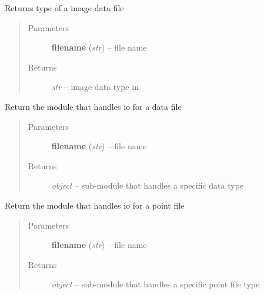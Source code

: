 \documentclass[letterpaper,10pt,english]{sphinxmanual}
\begin{document}

\begin{fulllineitems}
\label{api/ClearMap.IO:ClearMap.IO.IO.dataFileNameToType}
Returns type of a image data file
\begin{quote}\begin{description}
\item[{Parameters}] \leavevmode
\textbf{filename} (\emph{str}) --
file name

\item[{Returns}] \leavevmode
\emph{str} --
image data type in {\hyperref[api/ClearMap.IO:ClearMap.IO.IO.dataFileTypes]{\emph{}}}

\end{description}\end{quote}

\end{fulllineitems}


\begin{fulllineitems}
\label{api/ClearMap.IO:ClearMap.IO.IO.dataFileNameToModule}
Return the module that handles io for a data file
\begin{quote}\begin{description}
\item[{Parameters}] \leavevmode
\textbf{filename} (\emph{str}) --
file name

\item[{Returns}] \leavevmode
\emph{object} --
sub-module that handles a specific data type

\end{description}\end{quote}

\end{fulllineitems}


\begin{fulllineitems}
\label{api/ClearMap.IO:ClearMap.IO.IO.pointFileNameToModule}
Return the module that handles io for a point file
\begin{quote}\begin{description}
\item[{Parameters}] \leavevmode
\textbf{filename} (\emph{str}) --
file name

\item[{Returns}] \leavevmode
\emph{object} --
sub-module that handles a specific point file type

\end{description}\end{quote}

\end{fulllineitems}
\end{document}
